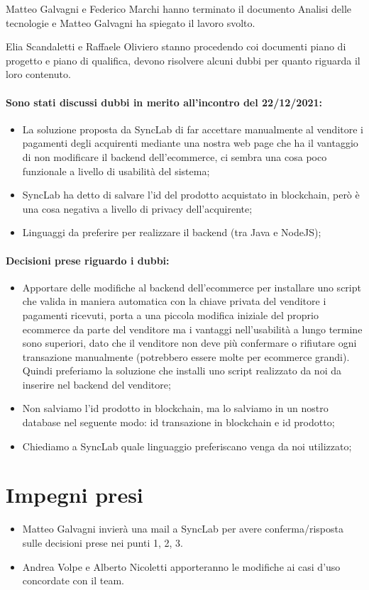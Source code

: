\documentclass[a4paper, 12pt]{article}
\begin{document}
Matteo Galvagni e Federico Marchi hanno terminato il documento Analisi delle tecnologie e Matteo Galvagni ha spiegato 
il lavoro svolto.

Elia Scandaletti e Raffaele Oliviero stanno procedendo coi documenti piano di progetto e piano di qualifica, devono risolvere
alcuni dubbi per quanto riguarda il loro contenuto.

\paragraph{Sono stati discussi dubbi in merito all'incontro del 22/12/2021:}
\begin{itemize}
\item La soluzione proposta da SyncLab di far accettare manualmente al venditore i pagamenti degli acquirenti mediante 
una nostra web page che ha il vantaggio di non modificare il backend dell'ecommerce, ci sembra una cosa poco funzionale
a livello di usabilità del sistema;
\item SyncLab ha detto di salvare l'id del prodotto acquistato in blockchain, però è una cosa negativa a livello
di privacy dell'acquirente;
\item Linguaggi da preferire per realizzare il backend (tra Java e NodeJS);
\end{itemize}

\paragraph{Decisioni prese riguardo i dubbi:}
\begin{itemize}
\item Apportare delle modifiche al backend dell'ecommerce per installare uno script che valida in maniera automatica con la chiave privata
del venditore i pagamenti ricevuti, porta a una piccola modifica iniziale del proprio ecommerce da parte del venditore
ma i vantaggi nell'usabilità a lungo termine sono superiori, dato che il venditore non deve più confermare o rifiutare
ogni transazione manualmente (potrebbero essere molte per ecommerce grandi). Quindi preferiamo la soluzione che installi uno 
script realizzato da noi da inserire nel backend del venditore;
\item Non salviamo l'id prodotto in blockchain, ma lo salviamo in un nostro database nel seguente modo: id transazione in blockchain e id 
prodotto;
\item Chiediamo a SyncLab quale linguaggio preferiscano venga da noi utilizzato;
\end{itemize}

\section{Impegni presi}
\begin{itemize}
\item Matteo Galvagni invierà una mail a SyncLab per avere conferma/risposta sulle decisioni prese nei punti 1, 2, 3.
\item Andrea Volpe e Alberto Nicoletti apporteranno le modifiche ai casi d'uso concordate con il team.
\end{itemize}
\end{document}
